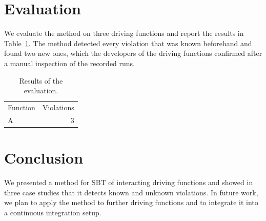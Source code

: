 \documentclass[runningheads]{llncs}
\begin{document}
\section{Evaluation}\label{sec:eval}
We evaluate the method on three driving functions and report the results in Table~\ref{tab:res}.
The method detected every violation that was known beforehand and found two new ones, which the
developers of the driving functions confirmed after a manual inspection of the recorded runs.
\begin{table}[t]
\centering
\caption{Results of the evaluation.}\label{tab:res}
\begin{tabular}{lr}
Function & Violations \\
A & 3 \\
\end{tabular}
\end{table}

\section{Conclusion}\label{sec:conc}
We presented a method for SBT of interacting driving functions and showed in
three case studies that it detects known and unknown violations. In future work, we plan to apply
the method to further driving functions and to integrate it into a continuous integration setup.



\end{document}
